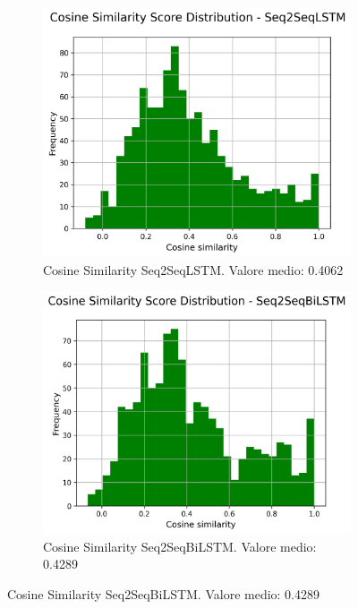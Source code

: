 \begin{figure}[H]
    \centering
    \begin{subfigure}{0.22\textwidth}
        \centering
        \includegraphics[width=\textwidth]{media/Seq2SeqLSTM_cosine_similarity_scores.png}
        \caption{Cosine Similarity Seq2SeqLSTM. Valore medio: 0.4062}
    \end{subfigure}
    \hfill
    \begin{subfigure}{0.22\textwidth}
        \centering
        \includegraphics[width=\textwidth]{media/Seq2SeqBiLSTM_cosine_similarity_scores.png}
        \caption{Cosine Similarity Seq2SeqBiLSTM. Valore medio: 0.4289}

\end{subfigure}
\end{figure}
